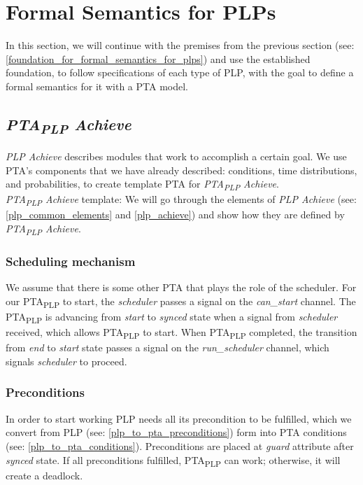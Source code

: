 \chapter{Formal Semantics for PLPs}
In this section, we will continue with the premises from the previous section (see: \ref{foundation_for_formal_semantics_for_plps}) and use the established foundation, to follow specifications of each type of PLP, with the goal to define a formal semantics for it with a PTA model.\\
\section{\textit{PTA\textsubscript{PLP} Achieve}}
\textit{PLP Achieve} describes modules that work to accomplish a certain goal. We use PTA’s components that we have already described: conditions, time distributions, and probabilities, to create template PTA for \textit{PTA\textsubscript{PLP} Achieve}. \\
\textit{PTA\textsubscript{PLP} Achieve} template:  We will go through the elements of \textit{PLP Achieve} (see: \ref{plp_common_elements} and \ref{plp_achieve}) and show how they are defined by \textit{PTA\textsubscript{PLP} Achieve}.\\
\subsection{Scheduling mechanism \label{pta_achieve_scheduling_mechanism}}
We assume that there is some other PTA that plays the role of the scheduler. For our PTA\textsubscript{PLP} to start, the\textit{ scheduler }passes a signal on the \textcolor{ColorUppaalChannel}{\textit{can_start}} channel. The PTA\textsubscript{PLP} is advancing from \textcolor{ColorUppaalState}{\textit{start}} to \textcolor{ColorUppaalState}{\textit{synced}} state when a signal from\textit{ scheduler }received, which allows PTA\textsubscript{PLP} to start. When PTA\textsubscript{PLP} completed, the transition from \textcolor{ColorUppaalState}{\textit{end}} to \textcolor{ColorUppaalState}{\textit{start}} state passes a signal on the \textcolor{ColorUppaalChannel}{\textit{run_scheduler}} channel, which signals\textit{ scheduler }to proceed.\\
\subsection{Preconditions \label{pta_achieve_preconditions}}
In order to start working PLP needs all its precondition to be fulfilled, which we convert from PLP (see: \ref{plp_to_pta_preconditions}) form into PTA conditions (see: \ref{plp_to_pta_conditions}). Preconditions are placed at \textit{guard} attribute after \textcolor{ColorUppaalState}{\textit{synced}} state. If all preconditions fulfilled, PTA\textsubscript{PLP} can work; otherwise, it will create a deadlock.\\
